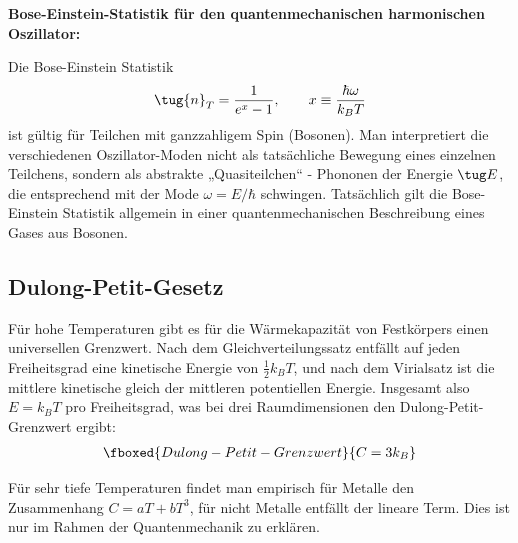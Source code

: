 \documentclass[bfvec]{summery_5.0}
\begin{document}
\begin{boxA}
{\bf Bose-Einstein-Statistik für den quantenmechanischen harmonischen Oszillator:}

Die Bose-Einstein Statistik
\begin{align*}
    \tug{n}_T = \frac{1}{e^x-1}, \qquad x\equiv \frac{\hbar\omega }{k_B T}
\end{align*}
ist gültig für Teilchen mit ganzzahligem Spin (Bosonen). Man interpretiert die verschiedenen Oszillator-Moden nicht als tatsächliche Bewegung eines einzelnen Teilchens, sondern als abstrakte
„Quasiteilchen“ - Phononen der Energie $\tug E$, die entsprechend mit der Mode $\omega = E/\hbar$ schwingen. Tatsächlich gilt die Bose-Einstein Statistik allgemein in einer quantenmechanischen Beschreibung eines Gases aus Bosonen.
\end{boxA} 

\subsection{Dulong-Petit-Gesetz}
Für hohe Temperaturen gibt es für die Wärmekapazität von Festkörpers einen universellen Grenzwert. Nach dem Gleichverteilungssatz entfällt auf jeden Freiheitsgrad eine kinetische Energie von $\frac12 k_B T$, und nach dem Virialsatz ist die mittlere kinetische gleich der mittleren potentiellen Energie. Insgesamt also $E = k_B T$ pro Freiheitsgrad, was bei drei Raumdimensionen den Dulong-Petit-Grenzwert ergibt:
\begin{align*}
    \fboxed{Dulong-Petit-Grenzwert}{C = 3k_B }
\end{align*}

Für sehr tiefe Temperaturen findet man empirisch für Metalle den Zusammenhang \(C = aT + bT^3\), für nicht Metalle entfällt der lineare Term. Dies ist nur im Rahmen der Quantenmechanik zu erklären.
\end{document}
